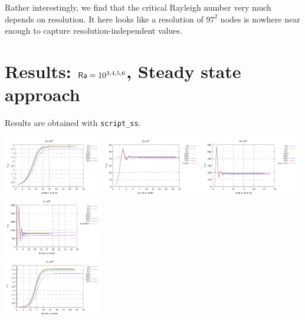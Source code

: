 Rather interestingly, we find that the critical Rayleigh number very much depends on resolution.
It here looks like a resolution of $97^2$ nodes is nowhere near enough to capture resolution-independent
values.

\newpage
\section*{Results: ${\mathsf{Ra}}=10^{3,4,5,6}$, Steady state approach}

Results are obtained with {\tt script\_ss}. 

\begin{center}
\includegraphics[width=4.297cm]{python_codes/fieldstone_155/results_SS/vrms_Ra1e3}
\includegraphics[width=4.297cm]{python_codes/fieldstone_155/results_SS/vrms_Ra1e4}
\includegraphics[width=4.297cm]{python_codes/fieldstone_155/results_SS/vrms_Ra1e5}
\includegraphics[width=4.297cm]{python_codes/fieldstone_155/results_SS/vrms_Ra1e6}\\
\includegraphics[width=4.297cm]{python_codes/fieldstone_155/results_SS/Nu_Ra1e3}

\end{center}
